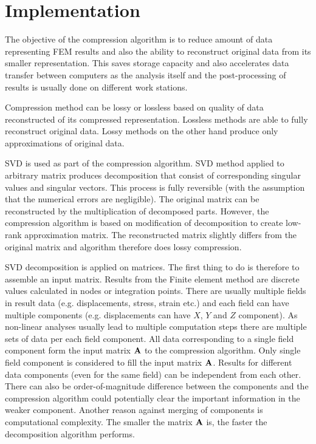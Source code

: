 \section{Implementation}
\label{sec:implementation}

The objective of the compression algorithm is to reduce amount of data representing FEM results and also the ability to reconstruct original data from its smaller representation. This saves storage capacity and also accelerates data transfer between computers as the analysis itself and the post-processing of results is usually done on different work stations.

Compression method can be lossy or lossless based on quality of data reconstructed of its compressed representation. Lossless methods are able to fully reconstruct original data. Lossy methods on the other hand produce only approximations of original data. 

SVD is used as part of the compression algorithm. SVD method applied to arbitrary matrix produces decomposition that consist of corresponding singular values and singular vectors. This process is fully reversible (with the assumption that the numerical errors are negligible). The original matrix can be reconstructed by the multiplication of decomposed parts. However, the compression algorithm is based on modification of decomposition to create low-rank approximation matrix. The reconstructed matrix slightly differs from the original matrix and algorithm therefore does lossy compression.

SVD decomposition is applied on matrices. The first thing to do is therefore to assemble an input matrix. Results from the Finite element method are discrete values calculated in nodes or integration points. There are usually multiple fields in result data (e.g. displacements, stress, strain etc.) and each field can have multiple components (e.g. displacements can have $X$, $Y$ and $Z$ component). As non-linear analyses usually lead to multiple computation steps there are multiple sets of data per each field component. All data corresponding to a single field component form the input matrix $\mathbf{A}$ to the compression algorithm. Only single field component is considered to fill the input matrix $\mathbf{A}$. Results for different data components (even for the same field) can be independent from each other. There can also be order-of-magnitude difference between the components and the compression algorithm could potentially clear the important information in the weaker component. Another reason against merging of components is computational complexity. The smaller the matrix $\mathbf{A}$ is, the faster the decomposition algorithm performs.

